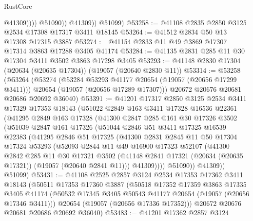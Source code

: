 \begin{lexlean}{RustCore}
\begin{coremodule}
                      @41309))))
              @51090))
          @41309))
      @51099)
@53258 := @41108 @2835 @2850 @3125 @2534 @17308 @17317 @3411 @18145
@53264 := @41512 @2834 @50 @13 @17308 @17315 @3887
@53274 := @41154 @2833 @11 @49 @3869 @17307 @17314 @3863 @17288 @3405 @41174
@53284 := @41135 @2831 @285 @11 @30 @17304 @3411 @3502 @3863 @17298 @3405
@53293 := @41148 @2830 @17304 (@20634 (@20635 @17304)) (@19057 (@20640 @2830 @11))
@53314 := @53258
    (@53264
      (@53274
        (@53284 @53293 @41177 @20654 (@19057 (@20656 @17299 @3411)))
        @20654
        (@19057 (@20656 @17289 @17307)))
      @20672
      @20676
      @20681
      @20686
      @20692
      @36040)
@53391 := @41201
    @17317
    @2850
    @3125
    @2534
    @3411
    @17329
    @17353
    @18143
    (@51022
      @2849
      @163
      @3411
      @17328
      @16536
      @22361
      (@41295
        @2849
        @163
        @17328
        (@41300
          @2847
          @285
          @161
          @30
          @17326
          @3502
          (@51039
            @2847
            @161
            @17326
            (@51044
              @2846
              @51
              @3411
              @17325
              @16539
              @22383
              (@41295
                @2846
                @51
                @17325
                (@41300
                  @2831
                  @2845
                  @11
                  @50
                  @17304
                  @17324
                  @53293
                  (@52093
                    @2844
                    @11
                    @49
                    @16900
                    @17323
                    @52107
                    (@41300
                      @2842
                      @285
                      @11
                      @30
                      @17321
                      @3502
                      (@41148 @2841 @17321 (@20634 (@20635 @17321)) (@19057 (@20640 @2841 @11)))
                      @41309))))
              @51090))
          @41309))
      @51099)
@53431 := @41108
    @2525
    @2857
    @3124
    @2534
    @17353
    @17362
    @3411
    @18143
    (@50511
      @17353
      @17360
      @3887
      (@50518
        @17352
        @17359
        @3863
        @17335
        @3405
        @41174
        (@50532 @17345 @3405 @50543 @41177 @20654 (@19057 (@20656 @17346 @3411)))
        @20654
        (@19057 (@20656 @17336 @17352)))
      @20672
      @20676
      @20681
      @20686
      @20692
      @36040)
@53483 := @41201
    @17362
    @2857
    @3124

\end{coremodule}
\end{lexlean}
